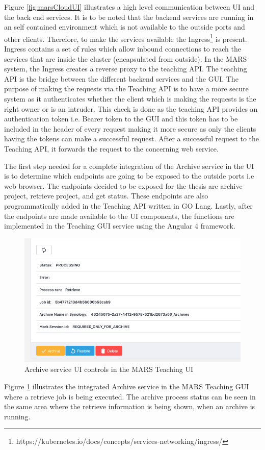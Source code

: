 Figure \ref{fig:marsCloudUI} illustrates a high level communication between UI and the back end services. It is to be noted that the backend services
are running in an self contained environment which is not available to the outside ports and other clients. Therefore, 
to make the services available the Ingress\footnote{https://kubernetes.io/docs/concepts/services-networking/ingress/} is present. Ingress contains
a set of rules which allow inbound connections to reach the services that are inside the cluster (encapsulated from outside). In the MARS system,
the Ingress creates a reverse proxy to the teaching API. The teaching API is the bridge between the different backend services and the GUI. The purpose
of making the requests via the Teaching API is to have a more secure system as it authenticates whether the client which is making the requests is the right owner or 
is an intruder. This check is done as the teaching API provides an authentication token i.e. Bearer token to the GUI and this token has to be included in the
header of every request making it more secure as only the clients having the tokens can make a successful request. After a successful request to the Teaching API,
it forwards the request to the concerning web service.


The first step needed for a complete integration of the Archive service in the UI is to determine which endpoints are going to be exposed to the outside ports i.e web browser.
The endpoints decided to be exposed for the thesis are archive project, retrieve project, and get status. These endpoints are also programmatically added
in the Teaching API written in GO Lang. Lastly, after the endpoints are made available to the UI components, the functions are implemented in the Teaching GUI service
using the Angular 4 framework. 

\begin{figure}[H]
    \centering \includegraphics[scale=0.5]{grafiken/archiveUI.png}
    \caption{Archive service UI controls in the MARS Teaching UI}
    \label{fig:archiveUI}
\end{figure}

Figure \ref{fig:archiveUI} illustrates the integrated Archive service in the MARS Teaching GUI where a retrieve job is being executed. The archive process
status can be seen in the same area where the retrieve information is being shown, when an archive is running.
